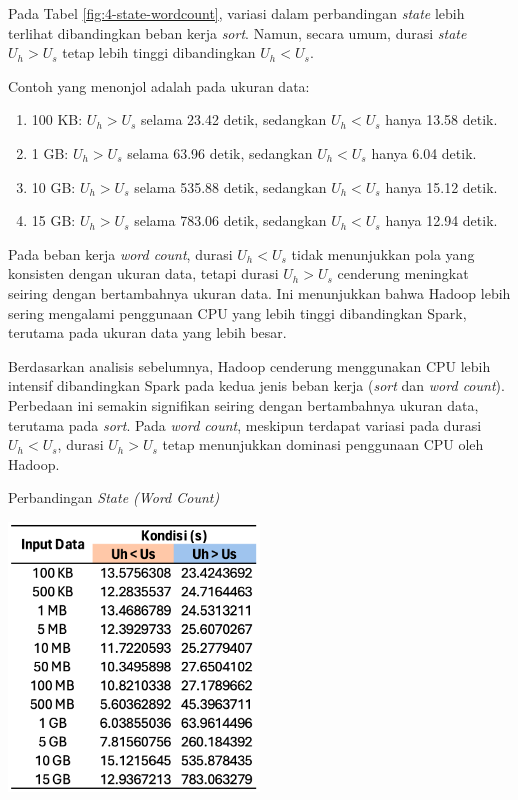 Pada Tabel \ref{fig:4-state-wordcount}, variasi dalam perbandingan \textit{state} lebih terlihat dibandingkan beban kerja \textit{sort}. Namun, secara umum, durasi \textit{state} $U_h > U_s$ tetap lebih tinggi dibandingkan $U_h < U_s$.

Contoh yang menonjol adalah pada ukuran data:
\begin{enumerate}
	\item 100 KB: $U_h > U_s$ selama 23.42 detik, sedangkan $U_h < U_s$ hanya 13.58 detik.
	\item 1 GB: $U_h > U_s$ selama 63.96 detik, sedangkan $U_h < U_s$ hanya 6.04 detik.
	\item 10 GB: $U_h > U_s$ selama 535.88 detik, sedangkan $U_h < U_s$ hanya 15.12 detik.
	\item 15 GB: $U_h > U_s$ selama 783.06 detik, sedangkan $U_h < U_s$ hanya 12.94 detik.
\end{enumerate}

Pada beban kerja \textit{word count}, durasi $U_h < U_s$ tidak menunjukkan pola yang konsisten dengan ukuran data, tetapi durasi $U_h > U_s$ cenderung meningkat seiring dengan bertambahnya ukuran data. Ini menunjukkan bahwa Hadoop lebih sering mengalami penggunaan CPU yang lebih tinggi dibandingkan Spark, terutama pada ukuran data yang lebih besar.

Berdasarkan analisis sebelumnya, Hadoop cenderung menggunakan CPU lebih intensif dibandingkan Spark pada kedua jenis beban kerja (\textit{sort} dan \textit{word count}). Perbedaan ini semakin signifikan seiring dengan bertambahnya ukuran data, terutama pada \textit{sort}. Pada \textit{word count}, meskipun terdapat variasi pada durasi $U_h < U_s$, durasi $U_h > U_s$ tetap menunjukkan dominasi penggunaan CPU oleh Hadoop. 

\begin{table}[h]
  \centering
  \caption{Perbandingan \textit{State  (Word Count)}}
  \includegraphics[width=0.5\textwidth]{figures/ch04/4-kondisi-wc}
  \label{fig:4-state-wordcount}
\end{table}


